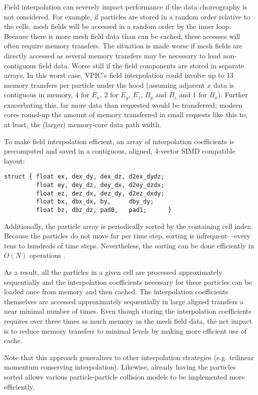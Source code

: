 \documentclass[letter,10pt]{article}
\begin{document}
Field interpolation can severely impact performance if the data
choreography is not considered.  For example, if particles are stored
in a random order relative to the cells, mesh fields will be accessed
in a random order by the inner loop.  Because there is more mesh field
data than can be cached, these accesses will often require memory
transfers.  The situation is made worse if mesh fields are directly
accessed as several memory transfers may be necessary to load
non-contiguous field data.  Worse still if the field components are
stored in separate arrays.  In this worst case, VPIC's field
interpolation could involve up to 13 memory transfers per particle
under the hood (assuming adjacent $x$ data is contiguous in memory, 4
for $E_x$, 2 for $E_y$, $E_z$, $B_y$ and $B_z$ and 1 for $B_x$).
Further exacerbating this, far more data than requested would be
transferred; modern cores round-up the amount of memory transferred in
small requests like this to, at least, the (larger) memory-core data
path width.

To make field interpolation efficient, an array of interpolation
coefficients is precomputed and saved in a contiguous, aligned,
4-vector SIMD compatible layout:
\begin{verbatim}
struct { float ex, dex_dy, dex_dz, d2ex_dydz;
         float ey, dey_dz, dey_dx, d2ey_dzdx;
         float ez, dez_dx, dez_dy, d2ez_dxdy;
         float bx, dbx_dx, by,     dby_dy;
         float bz, dbz_dz, pad0,   pad1;      }
\end{verbatim}
Additionally, the particle array is periodically sorted by the
containing cell index.  Because the particles do not move far per time
step, sorting is infrequent---every tens to hundreds of time steps.
Nevertheless, the sorting can be done efficiently in $O(N)$ operations
\cite{Bowers_2001}.

As a result, all the particles in a given cell are processed
approximately sequentially and the interpolation coefficients
necessary for these particles can be loaded once from memory and then
cached.  The interpolation coefficients themselves are accessed
approximately sequentially in large aligned transfers a near minimal
number of times.  Even though storing the interpolation coefficients
requires over three times as much memory as the mesh field data, the
net impact is to reduce memory transfers to minimal levels by making
more efficient use of cache.

Note that this approach generalizes to other interpolation strategies
(e.g. trilinear momentum conserving interpolation).  Likewise, already
having the particles sorted allows various particle-particle
collision models to be implemented more efficiently.  
\end{document}
